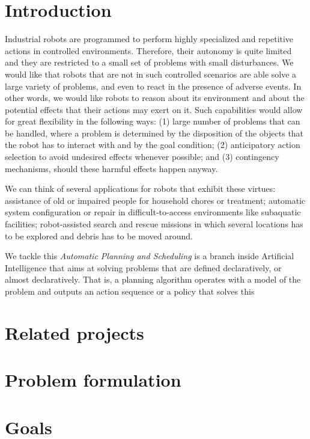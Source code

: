 \documentclass[../root.tex]{subfiles}
\begin{document}
\section{Introduction}

Industrial robots are programmed to perform highly specialized and
repetitive actions in controlled environments. Therefore, their
autonomy is quite limited and they are restricted to a small set
of problems with small disturbances. We would like that robots that are
not in such controlled scenarios are able solve a large variety of
problems, and even to react in the presence
of adverse events.
In other words, we
would like robots to reason about its environment and about the
potential effects that their actions may exert on it.
Such capabilities would allow for great flexibility in the following
ways: (1) large number of problems that can be handled, where a problem
is determined by the disposition of the objects that the robot has to
interact with and by the goal condition; (2) anticipatory
action selection to avoid undesired effects whenever possible; and (3)
contingency mechanisms, should these harmful effects happen anyway.

We can think of several applications for robots that exhibit these
virtues: assistance of old or impaired people for household chores
or treatment; automatic system
configuration or repair in difficult-to-access environments like
subaquatic facilities; robot-assisted search and rescue missions
in which several locations has to be explored and debris has to be
moved around.

We tackle this \emph{Automatic Planning and Scheduling} is a branch inside Artificial
Intelligence that aims at solving problems that are defined
declaratively, or almost declaratively. That is, a planning algorithm
operates with a model of the problem and outputs an action sequence
or a policy that solves this 

\section{Related projects}

\section{Problem formulation}

\section{Goals}

\end{document}
